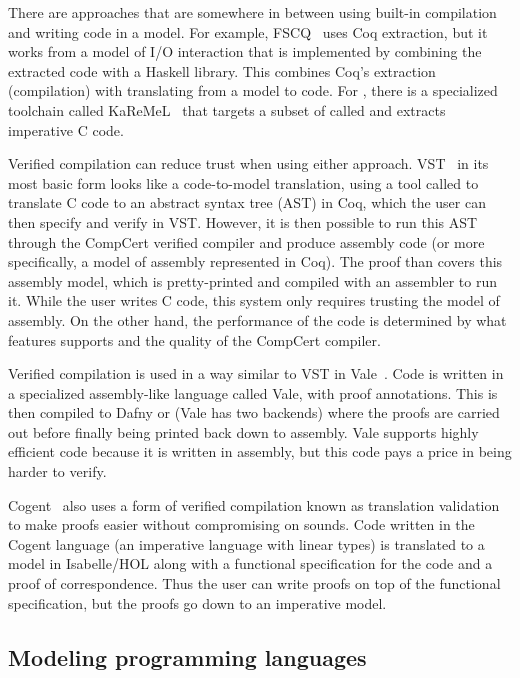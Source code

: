 There are approaches that are somewhere in between using built-in compilation
and writing code in a model. For example, FSCQ~\cite{chen:fscq} uses Coq
extraction, but it works from a model of I/O interaction that is implemented by
combining the extracted code with a Haskell library. This combines Coq's
extraction (compilation) with translating from a model to code. For \fstar,
there is a specialized toolchain called KaReMeL~\cite{protzenko:lowstar} that
targets a subset of \fstar called \lowstar and extracts imperative C code.

Verified compilation can reduce trust when using either approach.
VST~\cite{cao:vst-floyd} in its most basic form looks like a code-to-model
translation, using a tool called  to translate C code to an
abstract syntax tree (AST) in Coq, which the user can then specify and verify in
VST. However, it is then possible to run this AST through the CompCert verified
compiler and produce assembly code (or more specifically, a model of assembly
represented in Coq). The proof than covers this assembly model, which is
pretty-printed and compiled with an assembler to run it. While the user writes C
code, this system only requires trusting the model of assembly. On the other
hand, the performance of the code is determined by what features 
supports and the quality of the CompCert compiler.

Verified compilation is used in a way similar to VST in
Vale~\cite{bond:vale,fromherz:vale-fstar}. Code is written in a specialized
assembly-like language called Vale, with proof annotations. This is then
compiled to Dafny or \fstar (Vale has two backends) where the proofs are carried
out before finally being printed back down to assembly. Vale supports highly
efficient code because it is written in assembly, but this code pays a price in
being harder to verify.

Cogent~\cite{amani:cogent,oconnor:cogent-lang} also uses a form of verified
compilation known as translation validation to make proofs easier without compromising on sounds. Code
written in the Cogent language (an imperative language with linear types) is
translated to a model in Isabelle/HOL along with a functional specification for
the code and a proof of correspondence. Thus the user can write proofs on top of
the functional specification, but the proofs go down to an imperative model.

\subsection{Modeling programming languages}

